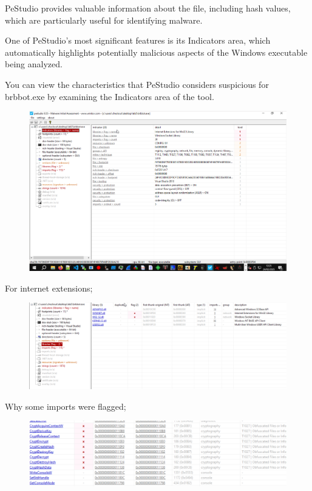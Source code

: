 \documentclass[]{project_plan}
\begin{document}
PeStudio provides valuable information about the file, including hash values,
which are particularly useful for identifying malware.

One of PeStudio’s
most significant features is its Indicators area, which automatically highlights
potentially malicious aspects of the Windows executable being analyzed.

You
can view the characteristics that PeStudio considers suspicious for brbbot.exe
by examining the Indicators area of the tool.

\begin{figure}[H]
  \centering
  \includegraphics[width=\linewidth]{lab3 indicators pestudio.png}
\end{figure}

For internet extensions;
\begin{figure}[H]
  \centering
  \includegraphics[width=\linewidth]{internet extensions pestudio lab3.png}
\end{figure}

Why some imports were flagged;
\begin{figure}[H]
  \centering
  \includegraphics[width=\linewidth]{lab3 flagged.png}
\end{figure}
\end{document}
